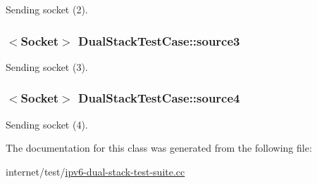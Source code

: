 Sending socket (2). 

\subsubsection[{\texorpdfstring{source3}{source3}}]{$<${\bf Socket}$>$ Dual\+Stack\+Test\+Case\+::source3\hspace{0.3cm}{\ttfamily [private]}}\hypertarget{classDualStackTestCase_ab7b8bea54582bc0ce4864dc184348813}{}\label{classDualStackTestCase_ab7b8bea54582bc0ce4864dc184348813}


Sending socket (3). 

\subsubsection[{\texorpdfstring{source4}{source4}}]{$<${\bf Socket}$>$ Dual\+Stack\+Test\+Case\+::source4\hspace{0.3cm}{\ttfamily [private]}}\hypertarget{classDualStackTestCase_af8c2e51627dab5f1189b9339c68aa248}{}\label{classDualStackTestCase_af8c2e51627dab5f1189b9339c68aa248}


Sending socket (4). 



The documentation for this class was generated from the following file\+:\begin{DoxyCompactItemize}
\item 
internet/test/\hyperlink{ipv6-dual-stack-test-suite_8cc}{ipv6-\/dual-\/stack-\/test-\/suite.\+cc}\end{DoxyCompactItemize}
